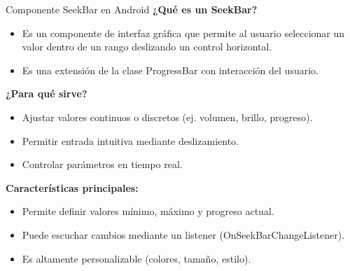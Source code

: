 \begin{frame}{Componente SeekBar en Android}
\textbf{¿Qué es un SeekBar?}

\begin{itemize}
    \item Es un componente de interfaz gráfica que permite al usuario seleccionar un valor dentro de un rango deslizando un control horizontal.
    \item Es una extensión de la clase ProgressBar con interacción del usuario.
\end{itemize}

\vspace{0.5cm}

\textbf{¿Para qué sirve?}
\begin{itemize}
    \item Ajustar valores continuos o discretos (ej. volumen, brillo, progreso).
    \item Permitir entrada intuitiva mediante deslizamiento.
    \item Controlar parámetros en tiempo real.
\end{itemize}

\vspace{0.5cm}

\textbf{Características principales:}
\begin{itemize}
    \item Permite definir valores mínimo, máximo y progreso actual.
    \item Puede escuchar cambios mediante un listener (OnSeekBarChangeListener).
    \item Es altamente personalizable (colores, tamaño, estilo).
\end{itemize}


\end{frame}


